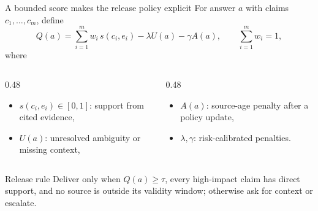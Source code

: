 \begin{frame}{A bounded score makes the release policy explicit}
  For answer $a$ with claims $c_1,\ldots,c_m$, define
  \begin{equation*}
    Q(a)
    = \sum_{i=1}^{m} w_i\,s(c_i,e_i)
      - \lambda U(a)
      - \gamma A(a),
    \qquad
    \sum_{i=1}^{m} w_i=1,
  \end{equation*}
  where
  \begin{columns}[T,onlytextwidth]
    \begin{column}{0.48\textwidth}
      \begin{itemize}
        \item $s(c_i,e_i)\in[0,1]$: support from cited evidence,
        \item $U(a)$: unresolved ambiguity or missing context,
      \end{itemize}
    \end{column}
    \begin{column}{0.48\textwidth}
      \begin{itemize}
        \item $A(a)$: source-age penalty after a policy update,
        \item $\lambda,\gamma$: risk-calibrated penalties.
      \end{itemize}
    \end{column}
  \end{columns}

  \begin{block}{Release rule}
    Deliver only when $Q(a)\geq\tau$, every high-impact claim has direct support, and no source is outside its validity window; otherwise ask for context or escalate.
  \end{block}
\end{frame}

